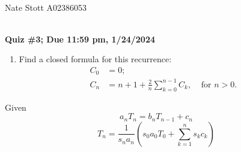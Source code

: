 \documentclass[10pt, AMS Euler]{article}
\begin{document}
	
	\\
        Nate Stott A02386053
	
	\noindent \underline{\hspace{2in}}\\
	
	{\bf Quiz \#3; Due 11:59 pm, 1/24/2024}\\
        

        \newpage
	\begin{enumerate}
		
		\item Find a closed formula for this recurrence:
		\begin{align*} C_0 &= 0;\\ C_n &= n+1 + \frac{2}{n}\sum_{k=0}^{n-1}C_k, \;\;\;\; \mbox{for $n>0$.}\end{align*}
        \end{enumerate}

            Given
                $$ a_n T_n = b_n T_{n-1} + c_n $$
                $$ T_n = \frac{1}{s_n a_n} (s_0 a_0 T_0 + \sum_{k=1}^n s_k c_k)$$
\end{document}
